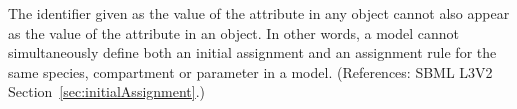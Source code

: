 The identifier given as the value of the attribute  in
any \InitialAssignment object cannot also appear as the value of the
 attribute in an \AssignmentRule object.  In other words, a
model cannot simultaneously define both an initial assignment and an
assignment rule for the same species, compartment or parameter in a model.
(References: SBML L3V2 Section~\ref{sec:initialAssignment}.)
